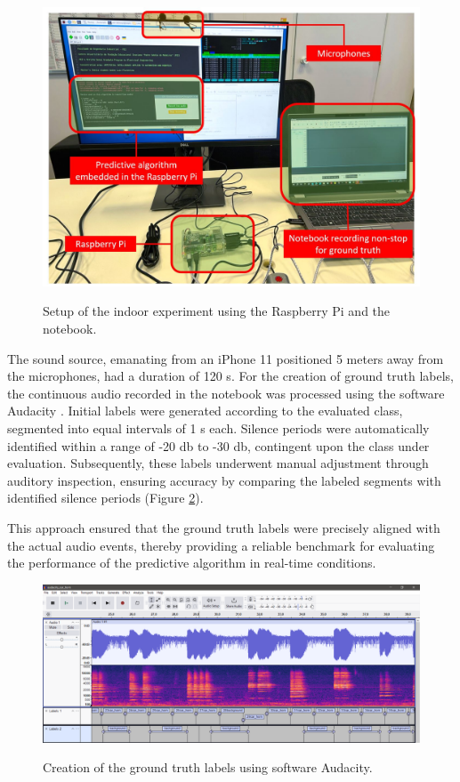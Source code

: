 \begin{figure}[htbp]
    \raggedright
        \caption{Setup of the indoor experiment using the Raspberry Pi and the notebook.}
        \includegraphics[width=.8\textwidth]{resources/images/050-methods/Methods_evaluation_indoor.jpg}
        \label{fig:methods_evaluation_indoor_experiment}
\end{figure}

The sound source, emanating from an iPhone 11 positioned 5 meters away from the microphones, had a duration of 120 \gls{s}. For the creation of ground truth labels, the continuous audio recorded in the notebook was processed using the software Audacity \cite{Audacity2024}. Initial labels were generated according to the evaluated class, segmented into equal intervals of 1 \gls{s} each. Silence periods were automatically identified within a range of -20 \gls{db} to -30 \gls{db}, contingent upon the class under evaluation. Subsequently, these labels underwent manual adjustment through auditory inspection, ensuring accuracy by comparing the labeled segments with identified silence periods (Figure \ref{fig:methods_evaluation_audacity_ground_truth}).

This approach ensured that the ground truth labels were precisely aligned with the actual audio events, thereby providing a reliable benchmark for evaluating the performance of the predictive algorithm in real-time conditions.

\begin{figure}[htbp]
    \raggedright
        \caption{Creation of the ground truth labels using software Audacity.}
        \includegraphics[width=1\textwidth]{resources/images/050-methods/Methods_evaluation_audacity_ground_truth.png}
        \label{fig:methods_evaluation_audacity_ground_truth}
\end{figure}


